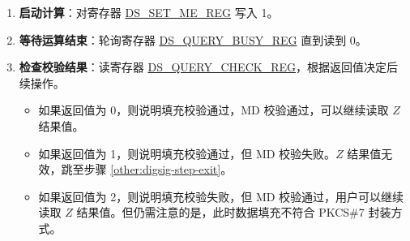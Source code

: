 \documentclass[main\_\_CN.tex]{subfiles}
\begin{document}
\begin{enumerate}
\begin{itemize}
        \item 将 \begin{math}\widehat{Box}_{i}\end{math}
        (\begin{math}i \in \{ 0, 1, \dots, 11 \} \end{math})
        写入存储器 \hyperref[DSBOXMEM]{DS\_BOX\_MEM}。

        其中 存储器
        \hyperref[DSYMEM]{DS\_Y\_MEM}、
        \hyperref[DSMMEM]{DS\_M\_MEM}、
        \hyperref[DSRBMEM]{DS\_RB\_MEM} 的
        容量均为 96 个字，
        而存储器 \hyperref[DSBOXMEM]{DS\_BOX\_MEM} 容量只有 12 个字。
        每一个字刚好存放一个 \begin{math}b\end{math} 进制数。
        存储块以小端字节序进行存储，即存储器的低地址存放运算子的低位进制数，高地址存放运算子的高位进制数。

    \end{itemize}

    \item {\bfseries 启动计算}：对寄存器 \hyperref[regdesc:DSSETMEREG]{DS\_SET\_ME\_REG} 写入 1。

    \item {\bfseries 等待运算结束}：轮询寄存器 \hyperref[regdesc:DSQUERYBUSYREG]{DS\_QUERY\_BUSY\_REG} 直到读到 0。

    \item {\bfseries 检查校验结果}：读寄存器 \hyperref[regdesc:DSQUERYCHECKREG]{DS\_QUERY\_CHECK\_REG}，根据返回值决定后续操作。

    \begin{itemize}

        \item 如果返回值为 0，则说明填充校验通过，MD 校验通过，可以继续读取 \begin{math}Z\end{math} 结果值。

        \item 如果返回值为 1，则说明填充校验通过，但 MD 校验失败。\begin{math}Z\end{math} 结果值无效，跳至步骤 \ref{other:digsig-step-exit}。

        \item 如果返回值为 2，则说明填充校验失败，但 MD 校验通过，用户可以继续读取 \begin{math}Z\end{math} 结果值。但仍需注意的是，此时数据填充不符合 PKCS\#7 封装方式。


\end{itemize}
\end{enumerate}
\end{document}
